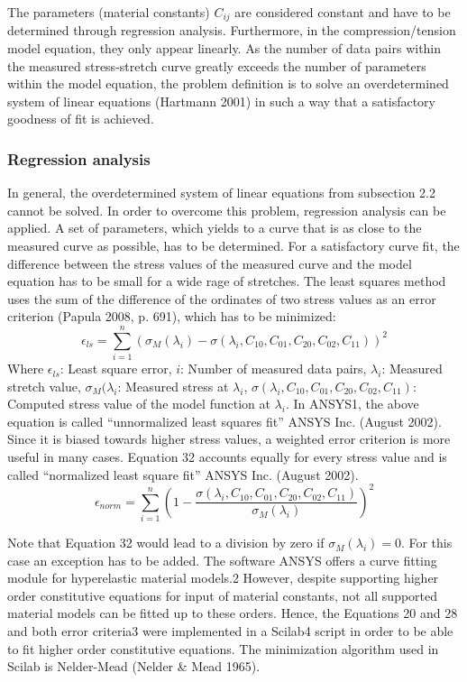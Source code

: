 The parameters (material constants) $C_{ij}$ are considered constant and have to be determined
through regression analysis. Furthermore, in the compression/tension model
equation, they only appear linearly. As the number of data pairs within the measured
stress-stretch curve greatly exceeds the number of parameters within the model equation,
the problem definition is to solve an overdetermined system of linear equations
(Hartmann 2001) in such a way that a satisfactory goodness of fit is achieved.

\subsubsection{Regression analysis}
In general, the overdetermined system of linear equations from subsection 2.2 cannot be
solved. In order to overcome this problem, regression analysis can be applied. A set of
parameters, which yields to a curve that is as close to the measured curve as possible, has
to be determined. For a satisfactory curve fit, the difference between the stress values of
the measured curve and the model equation has to be small for a wide rage of stretches.
The least squares method uses the sum of the difference of the ordinates of two stress
values as an error criterion (Papula 2008, p. 691), which has to be minimized:
\begin{equation}
\epsilon_{ls}=\sum^n_{i=1}\left(\sigma_M(\lambda_i)-\sigma(\lambda_i, C_{10}, C_{01}, C_{20}, C_{02}, C_{11})\right)^2 
\end{equation}
Where $\epsilon_{ls}$: Least square error, $i$: Number of measured data pairs, $\lambda_i$: Measured stretch value, $\sigma_M(\lambda_i$: Measured stress at $\lambda_i$, $\sigma(\lambda_i, C_{10}, C_{01}, C_{20}, C_{02}, C_{11})$: Computed stress value of the model function at $\lambda_i$.
In ANSYS1, the above equation is called “unnormalized least squares fit” ANSYS Inc. (August
2002).
Since it is biased towards higher stress values, a weighted error criterion is
more useful in many cases. Equation 32 accounts equally for every stress value and is
called “normalized least square fit” ANSYS Inc. (August 2002).
\begin{equation}
\epsilon_{norm}=\sum^n_{i=1}\left(1- \frac{\sigma(\lambda_i, C_{10}, C_{01}, C_{20}, C_{02}, C_{11})}{\sigma_M(\lambda_i)}\right)^2 
\end{equation}

Note that Equation 32 would lead to a division by zero if $\sigma_M(\lambda_i)=0$. For this case
an exception has to be added. 
The software ANSYS offers a curve fitting module for hyperelastic material models.2
However, despite supporting higher order constitutive equations for input of material
constants, not all supported material models can be fitted up to these orders. Hence,
the Equations 20 and 28 and both error criteria3 were implemented in a Scilab4 script in
order to be able to fit higher order constitutive equations. The minimization algorithm
used in Scilab is Nelder-Mead (Nelder \& Mead 1965).

